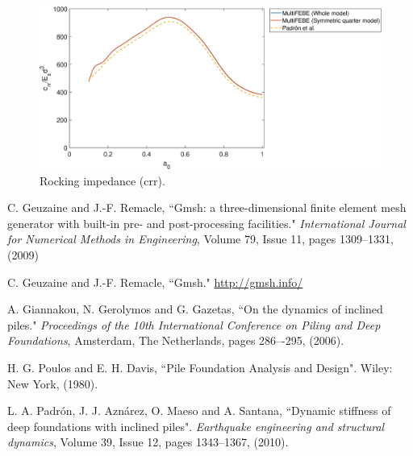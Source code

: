 \documentclass[a4]{article}
\begin{document}
\begin{figure}[h!]
	\centering
	\includegraphics[scale=0.5]{crr_2x2_group.eps}
	\caption{Rocking impedance (crr).}
	\label{fig:crr_2x2_group}
\end{figure}

\FloatBarrier

\begin{thebibliography}{99}
	 C. Geuzaine and J.-F. Remacle, ``Gmsh: a three-dimensional finite element mesh generator with built-in pre- and post-processing facilities." \textit{International Journal for Numerical Methods in Engineering}, Volume 79, Issue 11, pages 1309--1331, (2009)
	
	 C. Geuzaine and J.-F. Remacle, ``Gmsh." \url{http://gmsh.info/}
	
	  A. Giannakou, N. Gerolymos and G. Gazetas, ``On the dynamics of inclined piles." \textit{Proceedings of the 10th International	Conference on Piling and Deep Foundations}, Amsterdam, The Netherlands, pages 286–-295, (2006).
	
	 H. G. Poulos and E. H. Davis, ``Pile Foundation Analysis and Design". Wiley: New York, (1980).
	
	 L. A. Padrón, J. J. Aznárez, O. Maeso and A. Santana, ``Dynamic stiffness of deep foundations with inclined piles". \textit{Earthquake engineering and structural dynamics}, Volume 39, Issue 12, pages 1343--1367, (2010).
\end{thebibliography}
\end{document}

